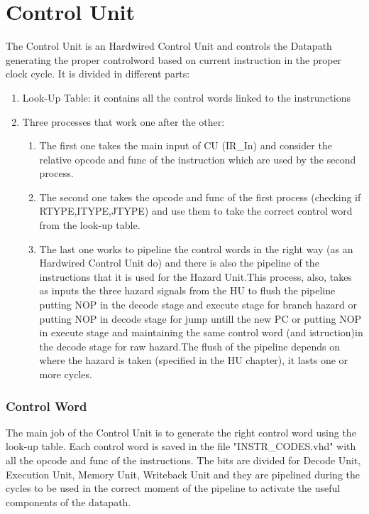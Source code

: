 \chapter{Control Unit}
\label{Control Unit}
The Control Unit is an Hardwired Control Unit and controls the Datapath generating the proper controlword based on current instruction in the proper clock cycle. It is divided in different parts:

\begin{enumerate} 
    \item Look-Up Table: it contains all the control words linked to the instrunctions
    \item Three processes that work one after the other:
    \begin{enumerate}
    \item The first one takes the main input of CU (IR\_In) and consider the relative opcode and func of the instruction which are used by the second process.
    \item The second one takes the opcode and func of the first process (checking if RTYPE,ITYPE,JTYPE) and use them to take the correct control word from the look-up table.
    \item The last one works to pipeline the control words in the right way (as an Hardwired Control Unit do) and there is also the pipeline of the instructions that it is used for the Hazard Unit.This process, also, takes as inputs the three hazard signals from the HU to flush the pipeline putting NOP in the decode stage and execute stage for branch hazard or putting NOP in decode stage for jump untill the new PC or putting NOP in execute stage and maintaining the same control word (and istruction)in the decode stage for raw hazard.The flush of the pipeline depends on where the hazard is taken (specified in the HU chapter), it lasts one or more cycles. 
    \end{enumerate}
\end{enumerate}
\subsection{Control Word}
The main job of the Control Unit is to generate the right control word using the look-up table. Each control word is saved in the file "INSTR\_CODES.vhd" with all the opcode and func of the instructions.
The bits are divided for Decode Unit, Execution Unit, Memory Unit, Writeback Unit and they are pipelined during the cycles to be used in the correct moment of the pipeline to activate the useful components of the datapath.

